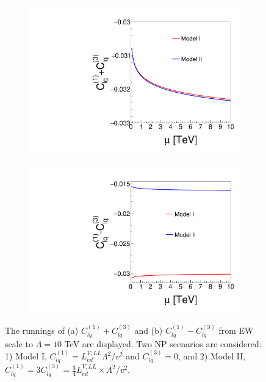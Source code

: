 \documentclass[a4paper,11pt]{article}
\begin{document}
\begin{figure}
  \centering
  \captionsetup[sub]{font=large}
  \begin{subfigure}[t]{0.45\textwidth}
     \includegraphics[width=\linewidth]{output_plus.pdf}
     \caption{}
  \end{subfigure}
  \begin{subfigure}[t]{0.45\textwidth}
     \includegraphics[width=\linewidth]{output_minus.pdf}
     \caption{}
  \end{subfigure}
  \caption{The runnings of (a) $C^{(1)}_{lq}+C^{(3)}_{lq}$ and (b) $C^{(1)}_{lq}-C^{(3)}_{lq}$ from EW scale to $\Lambda=10$ TeV are displayed.  Two NP scenarios are considered: 1) Model I, $C^{(1)}_{lq}=L^{V,LL}_{ed}\Lambda^2/v^2$ and $C^{(3)}_{lq}=0$, and 2) Model II, $C^{(1)}_{lq}=3C^{(3)}_{lq}=\frac{3}{4}L^{V,LL}_{ed}\times \Lambda^2/v^2$.\label{rge:EWtoUV}}
\end{figure}
\end{document}
